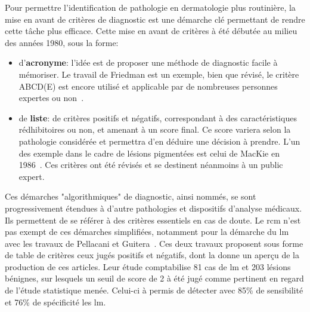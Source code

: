 \label{chap:preamble_microscopy}
Pour permettre l'identification de pathologie en dermatologie plus routinière, la mise en avant de critères de diagnostic est une démarche clé permettant de rendre cette tâche plus efficace. Cette mise en avant de critères à été débutée au milieu des années 1980, sous la forme:
\begin{itemize}
    \item d'\textbf{acronyme}: l'idée est de proposer une méthode de diagnostic facile à mémoriser. Le travail de Friedman est un exemple, bien que révisé, le critère ABCD(E) est encore utilisé et applicable par de nombreuses personnes expertes ou non~\cite{Friedman1985}.
    \item de \textbf{liste}: de critères positifs et négatifs, correspondant à des caractéristiques rédhibitoires ou non, et amenant à un score final. Ce score variera selon la pathologie considérée et permettra d'en déduire une décision à prendre. L'un des exemple dans le cadre de lésions pigmentées est celui de MacKie en 1986~\cite{mackie1986}. Ces critères ont été révisés et se destinent néanmoins à un public expert. 
\end{itemize}\par

Ces démarches "algorithmiques" de diagnostic, ainsi nommés, se sont progressivement étendues à d'autre pathologies et dispositifs d'analyse médicaux. Ils permettent de se référer à des critères essentiels en cas de doute. Le \gls{rcm} n'est pas exempt de ces démarches simplifiées, notamment pour la démarche du \gls{lm} avec les travaux de Pellacani et Guitera~\cite{Pellacani2007, Guitera2010}. Ces deux travaux proposent sous forme de table de critères ceux jugés positifs et négatifs, dont la  donne un aperçu de la production de ces articles. Leur étude comptabilise 81 cas de \gls{lm} et 203 lésions bénignes, sur lesquels un seuil de score de 2 à été jugé comme pertinent en regard de l'étude statistique menée. Celui-ci à permis de détecter avec 85\% de sensibilité et 76\% de spécificité les \gls{lm}.\par


